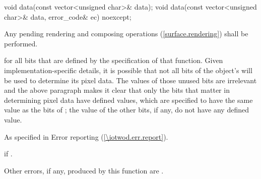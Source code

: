 \begin{itemdecl}
void data(const vector<unsigned char>& data);
void data(const vector<unsigned char>& data, error_code& ec) noexcept;
\end{itemdecl}
\begin{itemdescr}
\pnum
\effects
Any pending rendering and composing operations (\ref{surface.rendering}) shall be performed.

\pnum
\postconditions
{} for all bits that are defined by the specification of that function.
\enternote
Given implementation-specific details, it is possible that not all bits of the  object's \underlyingimagesurface will be used to determine its pixel data. The values of those unused bits are irrelevant and the above paragraph makes it clear that only the bits that matter in determining pixel data have defined values, which are specified to have the same value as the bits of ; the value of the other bits, if any, do not have any defined value.
\exitnote

\pnum
\throws
As specified in Error reporting (\ref{\iotwod.err.report}).

\pnum
\errors
{} if .

\pnum
Other errors, if any, produced by this function are .
\end{itemdescr}

